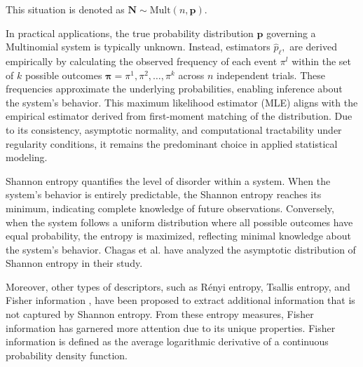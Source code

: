 This situation is denoted as $\mathbf{N}\sim \text{Mult}(n,\mathbf{p}).$ \cite{Rey2023}


In practical applications, the true probability distribution $\mathbf{p}$ governing a Multinomial system is typically unknown. 
Instead, estimators $\widehat{p}_\ell,$ are derived empirically by calculating the observed frequency of each event $\pi^l$ within the set of $k$ possible outcomes $\mathbf{\pi}=\pi^1,\pi^2, \dots, \pi^k$  across $n$ independent trials. These frequencies approximate the underlying probabilities, enabling inference about the system’s behavior. This maximum likelihood estimator (MLE) aligns with the empirical estimator derived from first-moment matching of the distribution. Due to its consistency, asymptotic normality, and computational tractability under regularity conditions, it remains the predominant choice in applied statistical modeling.

Shannon entropy quantifies the level of disorder within a system. When the system's behavior is entirely predictable, the Shannon entropy reaches its minimum, indicating complete knowledge of future observations. Conversely, when the system follows a uniform distribution where all possible outcomes have equal probability, the entropy is maximized, reflecting minimal knowledge about the system's behavior. Chagas et al. \cite{Chagas2022} have analyzed the asymptotic distribution of Shannon entropy in their study.


Moreover, other types of descriptors, such as Rényi entropy\cite{renyi1961measures}, Tsallis entropy\cite{tsallis1988possible}, and Fisher information \cite{frieden2004science}, have been proposed to extract additional information that is not captured by Shannon entropy.
From these entropy measures, Fisher information has garnered more attention due to its unique properties. Fisher information is defined as the average logarithmic derivative of a continuous probability density function.

